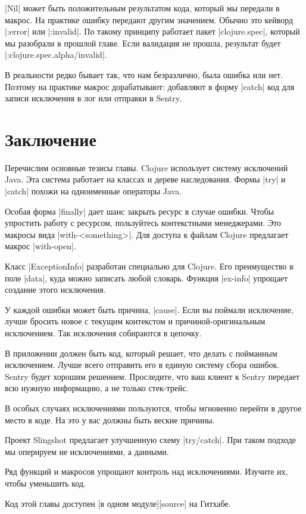 \spverb|Nil| может быть положительным результатом кода, который мы передали в
макрос. На практике ошибку передают другим значением. Обычно это кейворд
\spverb|:error| или \spverb|:invalid|. По такому принципу работает пакет \spverb|clojure.spec|,
который мы разобрали в прошлой главе. Если валидация не прошла, результат будет
\spverb|:clojure.spec.alpha/invalid|.

В реальности редко бывает так, что нам безразлично, была ошибка или нет. Поэтому
на практике макрос дорабатывают: добавляют в форму \spverb|catch| код для записи
исключения в лог или отправки в Sentry.

\section{Заключение}

Перечислим основные тезисы главы. Clojure использует систему исключений
Java. Эта система работает на классах и дереве наследования. Формы \spverb|try| и
\spverb|catch| похожи на одноименные операторы Java.

Особая форма \spverb|finally| дает шанс закрыть ресурс в случае ошибки. Чтобы упростить
работу с ресурсом, пользуйтесь контекстными менеджерами. Это макросы вида
\spverb|with-<something>|. Для доступа к файлам Clojure предлагает макрос \spverb|with-open|.

Класс \spverb|ExceptionInfo| разработан специально для Clojure. Его преимущество в поле
\spverb|data|, куда можно записать любой словарь. Функция \spverb|ex-info| упрощает создание
этого исключения.

У каждой ошибки может быть причина, \spverb|cause|. Если вы поймали исключение, лучше
бросить новое с текущим контекстом и причиной-оригинальным исключением. Так
исключения собираются в цепочку.

В приложении должен быть код, который решает, что делать с пойманным
исключением. Лучше всего отправить его в единую систему сбора ошибок. Sentry
будет хорошим решением. Проследите, что ваш клиент к Sentry передает всю нужную
информацию, а не только стек-трейс.

В особых случаях исключениями пользуются, чтобы мгновенно перейти в другое место
в коде. На это у вас должны быть веские причины.

Проект Slingshot предлагает улучшенную схему \spverb|try/catch|. При таком подходе мы
оперируем не исключениями, а данными.

Ряд функций и макросов упрощают контроль над исключениями. Изучите их, чтобы
уменьшить код.


Код этой главы доступен [в одном модуле][source] на Гитхабе.

